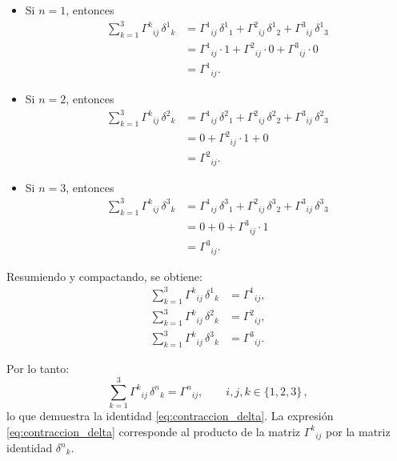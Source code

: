 \documentclass[../apunte_mecanica_clasica.tex]{subfiles}%
\begin{document}
\begin{itemize}
    \item[a)] Si $n=1$, entonces
    \begin{align*}
        \sum_{k=1}^3 \Gamma^k{}_{ij}\,\delta^1{}_k
        &= \Gamma^1{}_{ij}\,\delta^1{}_1 
         + \Gamma^2{}_{ij}\,\delta^1{}_2
         + \Gamma^3{}_{ij}\,\delta^1{}_3 \\[4pt]
        &= \Gamma^1{}_{ij}\cdot 1 + \Gamma^2{}_{ij}\cdot 0 + \Gamma^3{}_{ij}\cdot 0 \\[4pt]
        &= \Gamma^1{}_{ij}.
    \end{align*}

    \item[b)] Si $n=2$, entonces
    \begin{align*}
        \sum_{k=1}^3 \Gamma^k{}_{ij}\,\delta^2{}_k
        &= \Gamma^1{}_{ij}\,\delta^2{}_1 
         + \Gamma^2{}_{ij}\,\delta^2{}_2
         + \Gamma^3{}_{ij}\,\delta^2{}_3 \\[4pt]
        &= 0 + \Gamma^2{}_{ij}\cdot 1 + 0 \\[4pt]
        &= \Gamma^2{}_{ij}.
    \end{align*}

    \item[c)] Si $n=3$, entonces
    \begin{align*}
        \sum_{k=1}^3 \Gamma^k{}_{ij}\,\delta^3{}_k
        &= \Gamma^1{}_{ij}\,\delta^3{}_1 
         + \Gamma^2{}_{ij}\,\delta^3{}_2
         + \Gamma^3{}_{ij}\,\delta^3{}_3 \\[4pt]
        &= 0 + 0 + \Gamma^3{}_{ij}\cdot 1 \\[4pt]
        &= \Gamma^3{}_{ij}.
    \end{align*}
\end{itemize}

Resumiendo y compactando, se obtiene:
\begin{align*}
    \sum_{k=1}^3 \Gamma^k{}_{ij}\,\delta^1{}_k &= \Gamma^1{}_{ij}, \\[4pt]
    \sum_{k=1}^3 \Gamma^k{}_{ij}\,\delta^2{}_k &= \Gamma^2{}_{ij}, \\[4pt]
    \sum_{k=1}^3 \Gamma^k{}_{ij}\,\delta^3{}_k &= \Gamma^3{}_{ij}.
\end{align*}

Por lo tanto:
\begin{equation*}
    \sum_{k=1}^3 \Gamma^k{}_{ij}\,\delta^n{}_k = \Gamma^n{}_{ij},
    \qquad i,j,k \in \{1,2,3\}\,,
\end{equation*}
lo que demuestra la identidad \eqref{eq:contraccion_delta}. La expresión \eqref{eq:contraccion_delta} corresponde al producto de la 
matriz $\Gamma^k{}_{ij}$ por la matriz identidad $\delta^n{}_k$.
\end{document}
